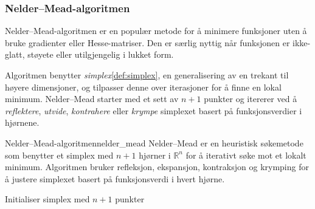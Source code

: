 \subsubsection{Nelder--Mead-algoritmen}
\label{sec:nelder_mead}

Nelder--Mead-algoritmen er en populær metode for å minimere funksjoner uten å bruke gradienter eller Hesse-matriser.
Den er særlig nyttig når funksjonen er ikke-glatt, støyete eller utilgjengelig i lukket form.

Algoritmen benytter \emph{simplex}\ref{def:simplex}, en generalisering av en trekant til høyere dimensjoner, og tilpasser denne over iterasjoner for å finne en lokal minimum.
Nelder--Mead starter med et sett av \( n+1 \) punkter og itererer ved å \emph{reflektere}, \emph{utvide}, \emph{kontrahere} eller \emph{krympe} simplexet basert på funksjonsverdier i hjørnene.

\begin{definition}{Nelder--Mead-algoritmen}{nelder_mead}
	Nelder--Mead er en heuristisk søkemetode som benytter et simplex med \( n+1 \) hjørner i \( \mathbb{R}^n \) for å iterativt søke mot et lokalt minimum.
	Algoritmen bruker refleksjon, ekspansjon, kontraksjon og krymping for å justere simplexet basert på funksjonsverdi i hvert hjørne.
\end{definition}

\begin{algorithm}[H]
	\caption{Nelder--Mead-algoritme}
	\label{alg:nelder-mead}
	Initialiser simplex med \( n+1 \) punkter\;
\end{algorithm}

